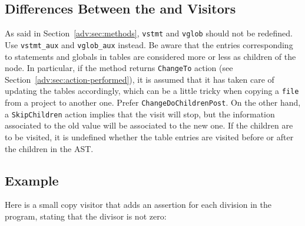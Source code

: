 \subsection{Differences Between the \cil and \framac Visitors}
\label{adv:sec:diff-betw-cil}

As said in Section~\ref{adv:sec:methods}, \verb+vstmt+ and \verb+vglob+ should
not be redefined. Use \verb+vstmt_aux+ and \verb+vglob_aux+ instead. Be aware
that the entries corresponding to statements and globals in \framac tables are
considered more or less as children of the node. In particular, if the method
returns \verb+ChangeTo+ action (see
Section~\ref{adv:sec:action-performed}), it is assumed that it has taken care of
updating the tables accordingly, which can be a little tricky when copying a
\verb+file+ from a project to
another one. Prefer
\verb+ChangeDoChildrenPost+.
On the other hand, a
\verb+SkipChildren+ action implies
that the visit will stop, but the information associated to the old value will
be associated to the new one. If the children are to be visited, it is undefined
whether the table entries are visited before or after the children in the AST.

\subsection{Example}

Here is a small copy visitor that adds an assertion for each
division in the program, stating that the divisor is not zero:

